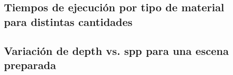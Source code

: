 
\subsection{Tiempos de ejecución por tipo de material para distintas cantidades}


\subsection{Variación de depth vs. spp para una escena preparada}

